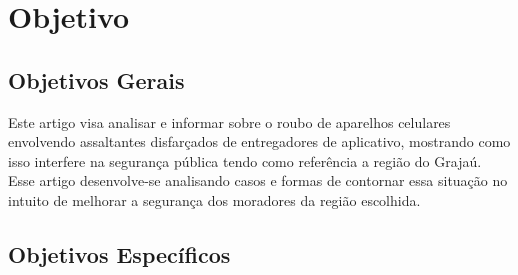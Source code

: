 \section{Objetivo}

    \subsection{Objetivos Gerais}


        Este artigo visa analisar e informar sobre o roubo de aparelhos celulares envolvendo
        assaltantes disfarçados de entregadores de aplicativo, mostrando como isso interfere
        na segurança pública tendo como referência a região do Grajaú. Esse artigo desenvolve-se
        analisando casos e formas de contornar essa situação no intuito de melhorar a segurança
        dos moradores da região escolhida.

    \subsection{Objetivos Específicos}

